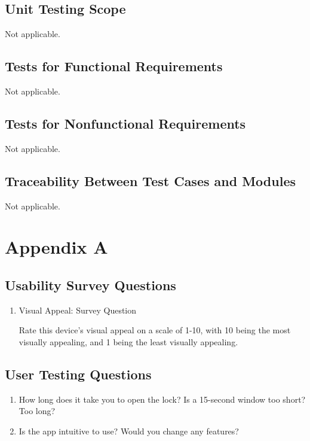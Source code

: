 \documentclass[12pt, titlepage]{article}
\begin{document}
\subsection{Unit Testing Scope}

Not applicable.

\subsection{Tests for Functional Requirements}

Not applicable.

\subsection{Tests for Nonfunctional Requirements}

Not applicable.

\subsection{Traceability Between Test Cases and Modules}

Not applicable.
				




\newpage

\section{Appendix A}

\subsection{Usability Survey Questions}

\begin{enumerate}

\item{Visual Appeal: Survey Question}
\label{Survey}

Rate this device's visual appeal on a scale of 1-10, with 10 being the most visually appealing, and 1 being the least visually appealing.
\end{enumerate}

\subsection{User Testing Questions}

\begin{enumerate}
    \item How long does it take you to open the lock? Is a 15-second window too short? Too long?
    \item Is the app intuitive to use? Would you change any features?
\end{enumerate}
\end{document}
